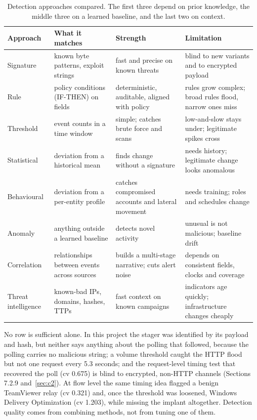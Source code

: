 \begin{table}[htbp]
  \centering
  \caption{Detection approaches compared. The first three depend on prior knowledge, the middle three on a learned baseline, and the last two on context.}
  \label{tab:detection-approaches}
  \footnotesize
  \setlength{\tabcolsep}{3pt}
  \begin{tabularx}{\linewidth}{@{}YYYY@{}}
    \toprule
    \textbf{Approach} & \textbf{What it matches} & \textbf{Strength} & \textbf{Limitation} \\
    \midrule
    Signature & known byte patterns, exploit strings & fast and precise on known threats & blind to new variants and to encrypted payload \\
    Rule & policy conditions (IF-THEN) on fields & deterministic, auditable, aligned with policy & rules grow complex; broad rules flood, narrow ones miss \\
    Threshold & event counts in a time window & simple; catches brute force and scans & low-and-slow stays under; legitimate spikes cross \\
    Statistical & deviation from a historical mean & finds change without a signature & needs history; legitimate change looks anomalous \\
    Behavioural & deviation from a per-entity profile & catches compromised accounts and lateral movement & needs training; roles and schedules change \\
    Anomaly & anything outside a learned baseline & detects novel activity & unusual is not malicious; baseline drift \\
    Correlation & relationships between events across sources & builds a multi-stage narrative; cuts alert noise & depends on consistent fields, clocks and coverage \\
    Threat intelligence & known-bad IPs, domains, hashes, TTPs & fast context on known campaigns & indicators age quickly; infrastructure changes cheaply \\
    \bottomrule
  \end{tabularx}
\end{table}

No row is sufficient alone. In this project the stager was identified by its payload and hash, but neither says anything about the polling that followed, because the polling carries no malicious string; a volume threshold caught the HTTP flood but not one request every 5.3 seconds; and the request-level timing test that recovered the poll (cv 0.675) is blind to encrypted, non-HTTP channels (Sections 7.2.9 and~\ref{sec:c2}). At flow level the same timing idea flagged a benign TeamViewer relay (cv 0.321) and, once the threshold was loosened, Windows Delivery Optimization (cv 1.203), while missing the implant altogether. Detection quality comes from combining methods, not from tuning one of them.

